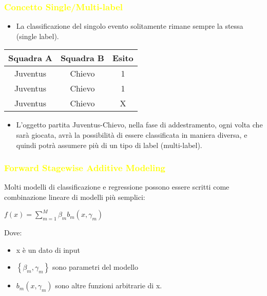 \documentclass[handout
]{beamer}
\def\yellow#1{{\textcolor{yellow}{#1}}}
\begin{document}
\begin{frame}
\frametitle{\yellow{Concetto Single/Multi-label}}
\begin{itemize}
\item La classificazione del singolo evento solitamente rimane sempre la stessa (single label).
\end{itemize}
\begin{table}[!h]
\centering
\begin{tabular}{|c|c|c|}
\hline
Squadra A&Squadra B&Esito\\
\hline
Juventus&Chievo&1\\
\hline
Juventus&Chievo&1\\
\hline
Juventus&Chievo&X\\
\hline
\end{tabular}
\end{table}
\begin{itemize}
\item L'oggetto partita Juventus-Chievo, nella fase di addestramento, ogni volta che sar\`a giocata, avr\`a la 
possibilit\`a di essere classificata in maniera diversa, e quindi potr\`a assumere 
pi\`u di un tipo di label (multi-label).
\end{itemize}
\end{frame}





\begin{frame}
\frametitle{\yellow{Forward Stagewise Additive Modeling}}
Molti modelli di classificazione e regressione possono essere scritti come combinazione lineare di modelli 
pi\`u semplici:
\begin{center}
 \begin{math}
  f(x)=\sum_{m=1}^M \beta_m b_m (x,\gamma_m)
 \end{math}
\end{center}
Dove:
\begin{itemize}
 \item x \`e un dato di input
 \item \begin{math}
        \left\{ \beta_m,\gamma_m\right\}
       \end{math} sono parametri del modello
 \item \begin{math}
         b_m(x,\gamma_m)
       \end{math} sono altre funzioni arbitrarie di x.
\end{itemize}
\end{frame}
\end{document}
